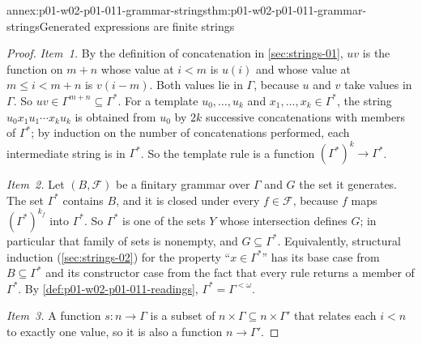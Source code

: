 \begin{annexitem}{annex:p01-w02-p01-011-grammar-strings}{thm:p01-w02-p01-011-grammar-strings}{Generated expressions are finite strings}
\begin{proof}
\emph{Item~1.} By the definition of concatenation in
\cref{sec:strings-01}, \(uv\) is the function on \(m+n\) whose value at
\(i<m\) is \(u(i)\) and whose value at \(m\leq i<m+n\) is \(v(i-m)\). Both
values lie in \(\Gamma\), because \(u\) and \(v\) take values in
\(\Gamma\). So \(uv\in\Gamma^{m+n}\subseteq\Gamma^*\). For a template
\(u_0,\ldots,u_k\) and \(x_1,\ldots,x_k\in\Gamma^*\), the string
\(u_0x_1u_1\cdots x_ku_k\) is obtained from \(u_0\) by \(2k\) successive
concatenations with members of \(\Gamma^*\); by induction on the number of
concatenations performed, each intermediate string is in \(\Gamma^*\). So
the template rule is a function \((\Gamma^*)^k\to\Gamma^*\).

\emph{Item~2.} Let \((B,\mathcal F)\) be a finitary grammar over \(\Gamma\)
and \(G\) the set it generates. The set \(\Gamma^*\) contains \(B\), and it
is closed under every \(f\in\mathcal F\), because \(f\) maps
\((\Gamma^*)^{k_f}\) into \(\Gamma^*\). So \(\Gamma^*\) is one of the sets
\(Y\) whose intersection defines \(G\); in particular that family of sets is
nonempty, and \(G\subseteq\Gamma^*\). Equivalently, structural induction
(\cref{sec:strings-02}) for the property ``\(x\in\Gamma^*\)'' has its base
case from \(B\subseteq\Gamma^*\) and its constructor case from the fact that
every rule returns a member of \(\Gamma^*\). By
\cref{def:p01-w02-p01-011-readings}, \(\Gamma^*=\Gamma^{<\omega}\).

\emph{Item~3.} A function \(s:n\to\Gamma\) is a subset of
\(n\times\Gamma\subseteq n\times\Gamma'\) that relates each \(i<n\) to
exactly one value, so it is also a function \(n\to\Gamma'\).
\end{proof}
\end{annexitem}

